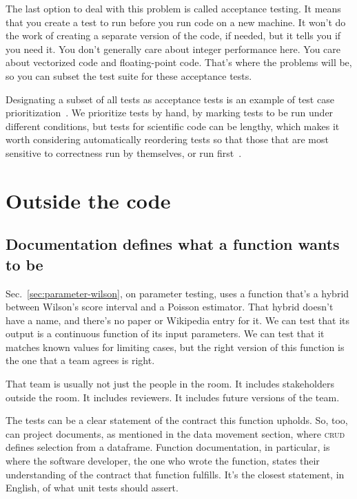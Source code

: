 \documentclass[fleqn,10pt]{olplainarticle}
\begin{document}
The last option to deal with this problem is called acceptance
testing. It means that you create a test to run before you
run code on a new machine. It won't do the work of creating
a separate version of the code, if needed, but it tells you if
you need it. You don't generally care about integer performance
here. You care about vectorized code and floating-point code.
That's where the problems will be, so you can subset the test
suite for these acceptance tests.

Designating a subset of all tests as acceptance tests is an
example of test case prioritization~\cite{rothermel1999test}.
We prioritize tests by hand, by marking tests to be run under
different conditions, but tests for scientific code can be lengthy,
which makes it worth considering automatically reordering tests
so that those that are most sensitive to correctness run by 
themselves, or run first~\cite{yoo2012regression}.


\section{Outside the code}\label{sec:outside-code}

\subsection{Documentation defines what a function wants to be}

Sec.~\ref{sec:parameter-wilson}, on parameter testing, uses a function that's a hybrid
between Wilson's score interval and a Poisson estimator. That hybrid
doesn't have a name, and there's no paper or Wikipedia entry for it.
We can test that its output is a continuous function of its input
parameters. We can test that it matches known values for limiting cases,
but the right version of this function is the one that a team agrees
is right.

That team is usually not just the people in the room. It includes stakeholders
outside the room. It includes reviewers. It includes future versions of the team.

The tests can be a clear statement of the contract this function upholds.
So, too, can project documents, as mentioned in the data movement section,
where \textsc{crud} defines selection from a dataframe. 
Function documentation, in particular, is where the software
developer, the one who wrote the function, states their understanding
of the contract that function fulfills. It's the closest statement,
in English, of what unit tests should assert.
\end{document}
